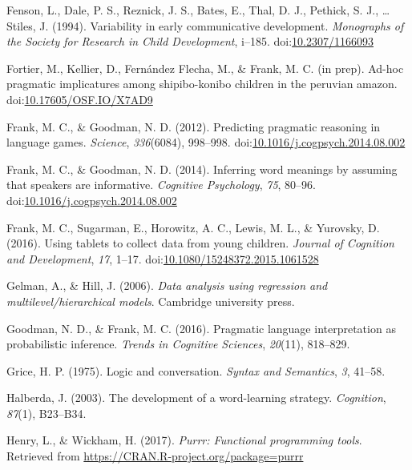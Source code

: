 \documentclass[mask,man]{apa6}
\theoremstyle{definition}
\theoremstyle{definition}
\theoremstyle{definition}
\theoremstyle{remark}
\begin{document}
\hypertarget{ref-fenson1994}{}
Fenson, L., Dale, P. S., Reznick, J. S., Bates, E., Thal, D. J.,
Pethick, S. J., \ldots{} Stiles, J. (1994). Variability in early
communicative development. \emph{Monographs of the Society for Research
in Child Development}, i--185.
doi:\href{https://doi.org/10.2307/1166093}{10.2307/1166093}

\hypertarget{ref-fortierunderrev}{}
Fortier, M., Kellier, D., Fernández Flecha, M., \& Frank, M. C. (in
prep). Ad-hoc pragmatic implicatures among shipibo-konibo children in
the peruvian amazon.
doi:\href{https://doi.org/10.17605/OSF.IO/X7AD9}{10.17605/OSF.IO/X7AD9}

\hypertarget{ref-frank2012}{}
Frank, M. C., \& Goodman, N. D. (2012). Predicting pragmatic reasoning
in language games. \emph{Science}, \emph{336}(6084), 998--998.
doi:\href{https://doi.org/10.1016/j.cogpsych.2014.08.002}{10.1016/j.cogpsych.2014.08.002}

\hypertarget{ref-frank2014}{}
Frank, M. C., \& Goodman, N. D. (2014). Inferring word meanings by
assuming that speakers are informative. \emph{Cognitive Psychology},
\emph{75}, 80--96.
doi:\href{https://doi.org/10.1016/j.cogpsych.2014.08.002}{10.1016/j.cogpsych.2014.08.002}

\hypertarget{ref-frank2016}{}
Frank, M. C., Sugarman, E., Horowitz, A. C., Lewis, M. L., \& Yurovsky,
D. (2016). Using tablets to collect data from young children.
\emph{Journal of Cognition and Development}, \emph{17}, 1--17.
doi:\href{https://doi.org/10.1080/15248372.2015.1061528}{10.1080/15248372.2015.1061528}

\hypertarget{ref-gelman2006data}{}
Gelman, A., \& Hill, J. (2006). \emph{Data analysis using regression and
multilevel/hierarchical models}. Cambridge university press.

\hypertarget{ref-goodman2016}{}
Goodman, N. D., \& Frank, M. C. (2016). Pragmatic language
interpretation as probabilistic inference. \emph{Trends in Cognitive
Sciences}, \emph{20}(11), 818--829.

\hypertarget{ref-grice1975logic}{}
Grice, H. P. (1975). Logic and conversation. \emph{Syntax and
Semantics}, \emph{3}, 41--58.

\hypertarget{ref-halberda2003development}{}
Halberda, J. (2003). The development of a word-learning strategy.
\emph{Cognition}, \emph{87}(1), B23--B34.

\hypertarget{ref-R-purrr}{}
Henry, L., \& Wickham, H. (2017). \emph{Purrr: Functional programming
tools}. Retrieved from \url{https://CRAN.R-project.org/package=purrr}
\end{document}

